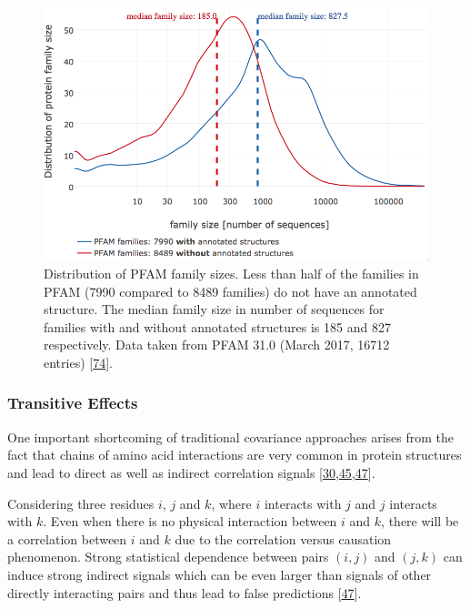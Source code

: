 \documentclass[12pt,a4paper,twoside]{book}
\theoremstyle{definition}
\theoremstyle{definition}
\theoremstyle{remark}
\begin{document}
\begin{figure}

{\centering \includegraphics[width=0.9\linewidth]{img/pfam_pdb_notitle} 

}

\caption{Distribution of PFAM family sizes. Less than half of
the families in PFAM (7990 compared to 8489 families) do not have an
annotated structure. The median family size in number of sequences for
families with and without annotated structures is 185 and 827
respectively. Data taken from PFAM 31.0 (March 2017, 16712 entries)
{[}\protect\hyperlink{ref-Finn2016}{74}{]}.}\label{fig:pfam}
\end{figure}

\hypertarget{transitive-effects}{\subsubsection*{Transitive
Effects}\label{transitive-effects}}

One important shortcoming of traditional covariance approaches arises
from the fact that chains of amino acid interactions are very common in
protein structures and lead to direct as well as indirect correlation
signals
{[}\protect\hyperlink{ref-Weigt2009}{30},\protect\hyperlink{ref-Lapedes1999}{45},\protect\hyperlink{ref-Burger2010}{47}{]}.

Considering three residues \(i\), \(j\) and \(k\), where \(i\) interacts
with \(j\) and \(j\) interacts with \(k\). Even when there is no
physical interaction between \(i\) and \(k\), there will be a
correlation between \(i\) and \(k\) due to the correlation versus
causation phenomenon. Strong statistical dependence between pairs
\((i,j)\) and \((j,k)\) can induce strong indirect signals which can be
even larger than signals of other directly interacting pairs and thus
lead to false predictions {[}\protect\hyperlink{ref-Burger2010}{47}{]}.
\end{document}
